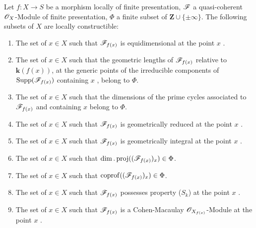 \begin{proposition}[9.9.2]
\label{IV.9.9.2}
Let $f:X\to S$ be a morphism locally of finite presentation, $\mathscr{F}$ a quasi-coherent $\mathscr{O}_X$-Module of finite presentation, $\Phi$ a finite subset of $\mathbf{Z}\cup\{\pm\infty\}$.
The following subsets of $X$ are locally constructible:
\begin{enumerate}[label=\textup{(\roman*)}]
  \item The set of $x\in X$ such that $\mathscr{F}_{f(x)}$ is equidimensional at the point $x$ .
  \item The set of $x\in X$ such that the geometric lengths of $\mathscr{F}_{f(x)}$ relative to $\boldsymbol{k}(f(x))$, at the generic points of the irreducible components of $\operatorname{Supp}(\mathscr{F}_{f(x)})$ containing $x$ , belong to $\Phi$.
  \item The set of $x\in X$ such that the dimensions of the prime cycles associated to $\mathscr{F}_{f(x)}$ and containing $x$ belong to $\Phi$.
  \item The set of $x\in X$ such that $\mathscr{F}_{f(x)}$ is geometrically reduced at the point $x$ .
  \item The set of $x\in X$ such that $\mathscr{F}_{f(x)}$ is geometrically integral at the point $x$ .
  \item The set of $x\in X$ such that $\dim.\operatorname{proj}((\mathscr{F}_{f(x)})_x)\in\Phi$.
  \item The set of $x\in X$ such that $\operatorname{coprof}((\mathscr{F}_{f(x)})_x)\in\Phi$.
  \item The set of $x\in X$ such that $\mathscr{F}_{f(x)}$ possesses property ($S_k$) at the point $x$ .
  \item The set of $x\in X$ such that $\mathscr{F}_{f(x)}$ is a Cohen-Macaulay $\mathscr{O}_{X_{f(x)}}$-Module at the point $x$ .
\end{enumerate}
\end{proposition}


